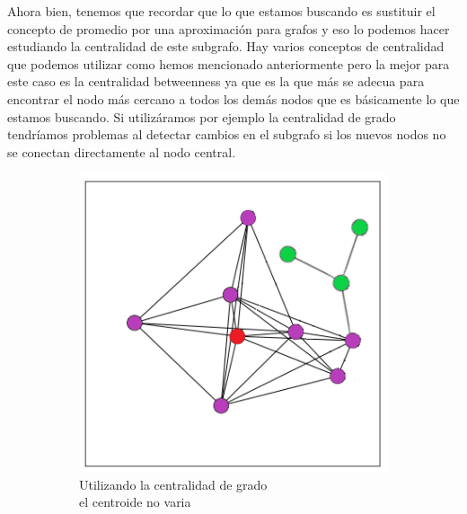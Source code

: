 \documentclass[12pt,a4paper]{article}
\begin{document}
			Ahora bien, tenemos que recordar que lo que estamos buscando es sustituir el concepto de promedio por una aproximación para grafos y eso lo podemos hacer estudiando la centralidad de este subgrafo. Hay varios conceptos de centralidad que podemos utilizar como hemos mencionado anteriormente pero la mejor para este caso es la centralidad betweenness ya que es la que más se adecua para encontrar el nodo más cercano a todos los demás nodos que es básicamente lo que estamos buscando. Si utilizáramos por ejemplo la centralidad de grado tendríamos problemas al detectar cambios en el subgrafo si los nuevos nodos no se conectan directamente al nodo central.\\
			\begin{figure}[H]
\centering
\begin{subfigure}{.5\textwidth}
  \centering
  \includegraphics[width=.9\linewidth]{subgrafo nodos grado}
  \caption{Utilizando la centralidad de grado\\ el centroide no varia}
  \label{fig:sub1}
\end{subfigure}%
\begin{subfigure}{.5\textwidth}
  \centering

\end{subfigure}
\end{figure}
\end{document}
